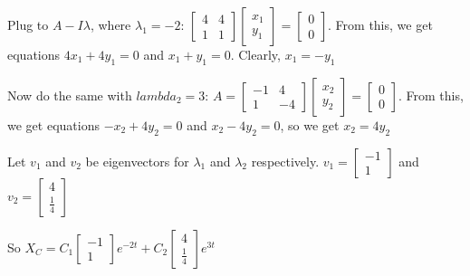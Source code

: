 \documentclass{article}
\begin{document}
\noindent Plug to $A - I\lambda$, where $\lambda_{1} = -2$: $\begin{bmatrix}
    4 & 4 \\
    1 & 1
\end{bmatrix}\begin{bmatrix}
    x_{1}\\
    y_{1}
\end{bmatrix} = 
\begin{bmatrix}
    0\\
    0
\end{bmatrix}$.  From this, we get equations $4x_{1} + 4y_{1} = 0$ and $x_{1} + y_{1} = 0$.  Clearly, $x_{1} = -y_{1}$ \par
\noindent Now do the same with $lambda_{2} = 3$: $A = \begin{bmatrix}
    -1 & 4 \\
    1 & -4
\end{bmatrix}\begin{bmatrix}
    x_{2}\\
    y_{2}
\end{bmatrix} = 
\begin{bmatrix}
    0\\
    0
\end{bmatrix}$.  From this, we get equations $-x_{2} + 4y_{2} = 0$ and $x_{2} - 4y_{2} = 0$, so we get $x_{2} = 4y_{2}$ \par\vspace{0.25cm}

\noindent Let $v_{1}$ and $v_{2}$ be eigenvectors for $\lambda_{1}$ and $\lambda_{2}$ respectively.  $v_{1} = \begin{bmatrix}
    -1\\
    1
\end{bmatrix}$ and $v_{2} = \begin{bmatrix}
    4\\
    \frac{1}{4}
\end{bmatrix}$ \par

\noindent So $X_{C} = C_{1}\begin{bmatrix}
    -1\\
    1
\end{bmatrix}e^{-2t} + C_{2}\begin{bmatrix}
    4\\
    \frac{1}{4}
\end{bmatrix}e^{3t}$ \par\vspace{0.25cm}
\end{document}

